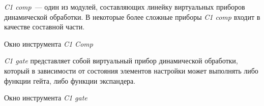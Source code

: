 \documentclass{beamer}
\begin{document}
\begin{frame}
\emph{C1 comp}~--- один из модулей, составляющих линейку виртуальных приборов динамической обработки. В некоторые более сложные приборы \emph{C1 comp} входит в качестве составной части.

  \begin{block}{Окно инструмента \emph{C1 Comp}}
  \end{block}
\end{frame}  

\begin{frame}
\emph{C1 gate} представляет собой виртуальный прибор динамической обработки, который в зависимости от состояния элементов настройки может выполнять либо функции гейта, либо функции экспандера.

  \begin{block}{Окно инструмента \emph{C1 gate}}
  \end{block}
\end{frame} 
\end{document}
